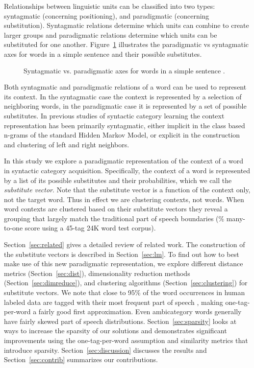 \documentclass[11pt]{article}
\begin{document}
Relationships between linguistic units can be classified into two
types: syntagmatic (concerning positioning), and paradigmatic
(concerning substitution).  Syntagmatic relations determine which
units can combine to create larger groups and paradigmatic relations
determine which units can be substituted for one another.
Figure~\ref{fig:paradigmatic} illustrates the paradigmatic vs
syntagmatic axes for words in a simple sentence and their possible
substitutes.

\begin{figure}[h] \centering

\caption{Syntagmatic vs. paradigmatic axes for words in a simple
  sentence \cite{chandler2007semiotics}.}
\label{fig:paradigmatic}
\end{figure}

Both syntagmatic and paradigmatic relations of a word can be used to
represent its context.  In the syntagmatic case the context is
represented by a selection of neighboring words, in the paradigmatic
case it is represented by a set of possible substitutes.  In previous
studies of syntactic category learning the context representation has
been primarily syntagmatic, either implicit in the class based n-grams
of the standard Hidden Markov Model, or explicit in the construction
and clustering of left and right neighbors.

In this study we explore a paradigmatic representation of the context
of a word in syntactic category acquisition.  Specifically, the
context of a word is represented by a list of its possible substitutes
and their probabilities, which we call the {\em substitute vector}.
Note that the substitute vector is a function of the context only, not
the target word.  Thus in effect we are clustering contexts, not
words.  When word contexts are clustered based on their substitute
vectors they reveal a grouping that largely match the traditional part
of speech boundaries (\collapseResult\% many-to-one score using a
45-tag 24K word test corpus).

Section~\ref{sec:related} gives a detailed review of related work.
The construction of the substitute vectors is described in
Section~\ref{sec:lm}.  To find out how to best make use of this new
paradigmatic representation, we explore different distance metrics
(Section~\ref{sec:dist}), dimensionality reduction methods
(Section~\ref{sec:dimreduce}), and clustering algorithms
(Section~\ref{sec:clustering}) for substitute vectors.  We note that
close to 95\% of the word occurrences in human labeled data are tagged
with their most frequent part of speech
\cite{Lee:2010:STU:1870658.1870741}, making one-tag-per-word a fairly
good first approximation.  Even ambicategory words generally have
fairly skewed part of speech distributions.
Section~\ref{sec:sparsity} looks at ways to increase the sparsity of
our solutions and demonstrates significant improvements using the
one-tag-per-word assumption and similarity metrics that introduce
sparsity.  Section~\ref{sec:discussion} discusses the results and
Section~\ref{sec:contrib} summarizes our contributions.
\end{document}

